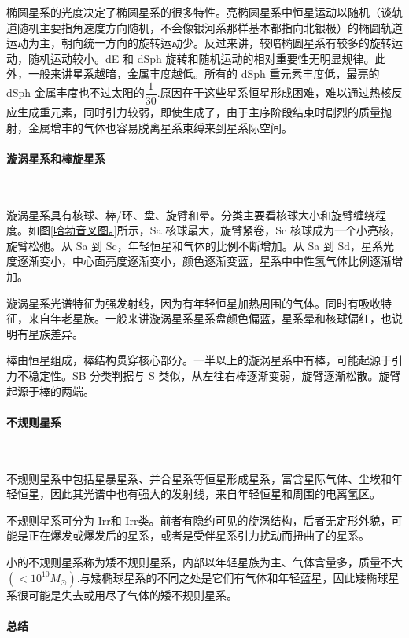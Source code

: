 \documentclass[../天体物理基础.tex]{subfiles}
\begin{document}
椭圆星系的光度决定了椭圆星系的很多特性。亮椭圆星系中恒星运动以随机（谈轨道随机主要指角速度方向随机，不会像银河系那样基本都指向北银极）的椭圆轨道运动为主，朝向统一方向的旋转运动少。反过来讲，较暗椭圆星系有较多的旋转运动，随机运动较小。dE 和 dSph 旋转和随机运动的相对重要性无明显规律。此外，一般来讲星系越暗，金属丰度越低。所有的 dSph 重元素丰度低，最亮的 dSph 金属丰度也不过太阳的$\dfrac{1}{30}$.原因在于这些星系恒星形成困难，难以通过热核反应生成重元素，同时引力较弱，即使生成了，由于主序阶段结束时剧烈的质量抛射，金属增丰的气体也容易脱离星系束缚来到星系际空间。

\paragraph{漩涡星系和棒旋星系}~{}

漩涡星系具有核球、棒/环、盘、旋臂和晕。分类主要看核球大小和旋臂缠绕程度。如图\ref{哈勃音叉图。}所示，Sa 核球最大，旋臂紧卷，Sc 核球成为一个小亮核，旋臂松弛。从 Sa 到 Sc，年轻恒星和气体的比例不断增加。从 Sa 到 Sd，星系光度逐渐变小，中心面亮度逐渐变小，颜色逐渐变蓝，星系中中性氢气体比例逐渐增加。

漩涡星系光谱特征为强发射线，因为有年轻恒星加热周围的气体。同时有吸收特征，来自年老星族。一般来讲漩涡星系星系盘颜色偏蓝，星系晕和核球偏红，也说明有星族差异。

棒由恒星组成，棒结构贯穿核心部分。一半以上的漩涡星系中有棒，可能起源于引力不稳定性。SB 分类判据与 S 类似，从左往右棒逐渐变弱，旋臂逐渐松散。旋臂起源于棒的两端。

\paragraph{不规则星系}~{}

不规则星系中包括星暴星系、并合星系等恒星形成星系，富含星际气体、尘埃和年轻恒星，因此其光谱中也有强大的发射线，来自年轻恒星和周围的电离氢区。

不规则星系可分为 Irr\uppercase\expandafter{}和 Irr\uppercase\expandafter{}类。前者有隐约可见的旋涡结构，后者无定形外貌，可能是正在爆发或爆发后的星系，或者是受伴星系引力扰动而扭曲了的星系。

小的不规则星系称为矮不规则星系，内部以年轻星族为主、气体含量多，质量不大$(<10^{10}M_{\odot})$.与矮椭球星系的不同之处是它们有气体和年轻蓝星，因此矮椭球星系很可能是失去或用尽了气体的矮不规则星系。

\paragraph{总结}~{}
\end{document}
